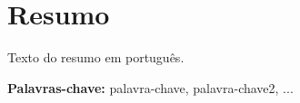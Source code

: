 \chapter*{Resumo}

Texto do resumo em português. \lipsum[1]

\vspace{.5cm}

\textbf{Palavras-chave:} palavra-chave, palavra-chave2, ...
